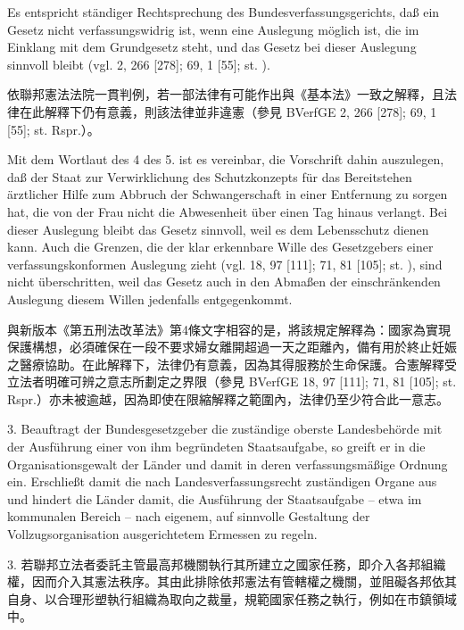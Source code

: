 \documentclass[12pt]{article}
\begin{document}
\begin{sourcepara}[title={原文E.248}]
Es entspricht ständiger Rechtsprechung des Bundesverfassungsgerichts, daß ein Gesetz nicht verfassungswidrig ist, wenn eine Auslegung möglich ist, die im Einklang mit dem Grundgesetz steht, und das Gesetz bei dieser Auslegung sinnvoll bleibt (vgl. \abbrBVerfGE{} 2, 266 [278]; 69, 1 [55]; st. \abbrRspr{}).
\end{sourcepara}
\begin{transpara}
依聯邦憲法法院一貫判例，若一部法律有可能作出與《基本法》一致之解釋，且法律在此解釋下仍有意義，則該法律並非違憲（參見 BVerfGE 2, 266 [278]; 69, 1 [55]; st. Rspr.）。
\end{transpara}

\begin{sourcepara}[title={原文E.249}]
Mit dem Wortlaut des \abbrArt{} 4 des 5. \abbrStrRG{} \abbrNF{} ist es vereinbar, die Vorschrift dahin auszulegen, daß der Staat zur Verwirklichung des Schutzkonzepts für das Bereitstehen ärztlicher Hilfe zum Abbruch der Schwangerschaft in einer Entfernung zu sorgen hat, die von der Frau nicht die Abwesenheit über einen Tag hinaus verlangt. Bei dieser Auslegung bleibt das Gesetz sinnvoll, weil es dem Lebensschutz dienen kann. Auch die Grenzen, die der klar erkennbare Wille des Gesetzgebers einer verfassungskonformen Auslegung zieht (vgl. \abbrBVerfGE{} 18, 97 [111]; 71, 81 [105]; st. \abbrRspr{}), sind nicht überschritten, weil das Gesetz auch in den Abmaßen der einschränkenden Auslegung diesem Willen jedenfalls entgegenkommt.
\end{sourcepara}
\begin{transpara}
與新版本《第五刑法改革法》第4條文字相容的是，將該規定解釋為：國家為實現保護構想，必須確保在一段不要求婦女離開超過一天之距離內，備有用於終止妊娠之醫療協助。在此解釋下，法律仍有意義，因為其得服務於生命保護。合憲解釋受立法者明確可辨之意志所劃定之界限（參見 BVerfGE 18, 97 [111]; 71, 81 [105]; st. Rspr.）亦未被逾越，因為即使在限縮解釋之範圍內，法律仍至少符合此一意志。
\end{transpara}

\begin{sourcepara}[title={原文E.250}]
3. Beauftragt der Bundesgesetzgeber die zuständige oberste Landesbehörde mit der Ausführung einer von ihm begründeten Staatsaufgabe, so greift er in die Organisationsgewalt der Länder und damit in deren verfassungsmäßige Ordnung ein. Erschließt damit die nach Landesverfassungsrecht zuständigen Organe aus und hindert die Länder damit, die Ausführung der Staatsaufgabe -- etwa im kommunalen Bereich -- nach eigenem, auf sinnvolle Gestaltung der Vollzugsorganisation ausgerichtetem Ermessen zu regeln.
\end{sourcepara}
\begin{transpara}
3. 若聯邦立法者委託主管最高邦機關執行其所建立之國家任務，即介入各邦組織權，因而介入其憲法秩序。其由此排除依邦憲法有管轄權之機關，並阻礙各邦依其自身、以合理形塑執行組織為取向之裁量，規範國家任務之執行，例如在市鎮領域中。
\end{transpara}
\end{document}
